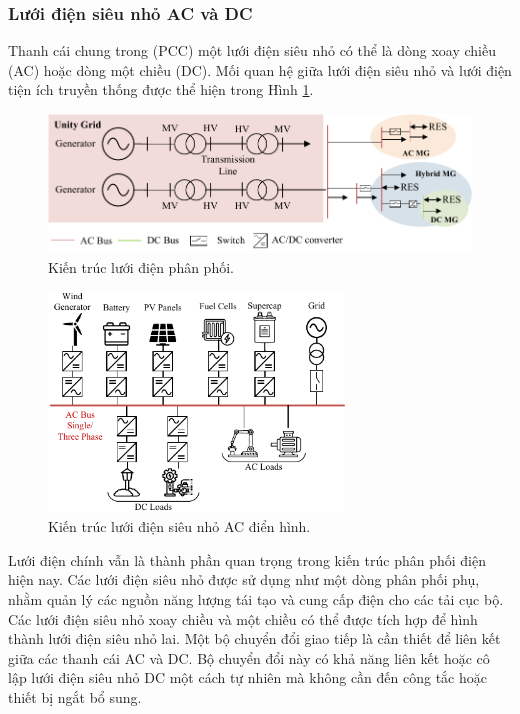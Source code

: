 \subsubsection{Lưới điện siêu nhỏ AC và DC}
Thanh cái chung trong (PCC) một lưới điện siêu nhỏ có thể là dòng xoay chiều (AC) hoặc dòng một chiều (DC). Mối quan hệ giữa lưới điện siêu nhỏ và lưới điện tiện ích truyền thống được thể hiện trong Hình \ref{fig:C1_4}.\par
\begin{figure}
    \centering
    \includegraphics[width=\textwidth]{Figures/Content_Pages/Chapter_1/C1_4.pdf}
    \caption{Kiến trúc lưới điện phân phối.}
    \label{fig:C1_4}
\end{figure}
\begin{figure}
    \centering
    \includegraphics[width=0.7\textwidth]{Figures/Content_Pages/Chapter_1/C1_5.pdf}
    \caption{Kiến trúc lưới điện siêu nhỏ AC điển hình.}
    \label{fig:C1_5}
\end{figure}
Lưới điện chính vẫn là thành phần quan trọng trong kiến trúc phân phối điện hiện nay. Các lưới điện siêu nhỏ được sử dụng như một dòng phân phối phụ, nhằm quản lý các nguồn năng lượng tái tạo và cung cấp điện cho các tải cục bộ. Các lưới điện siêu nhỏ xoay chiều và một chiều có thể được tích hợp để hình thành lưới điện siêu nhỏ lai. Một bộ chuyển đổi giao tiếp là cần thiết để liên kết giữa các thanh cái AC và DC. Bộ chuyển đổi này có khả năng liên kết hoặc cô lập lưới điện siêu nhỏ DC một cách tự nhiên mà không cần đến công tắc hoặc thiết bị ngắt bổ sung.\par
